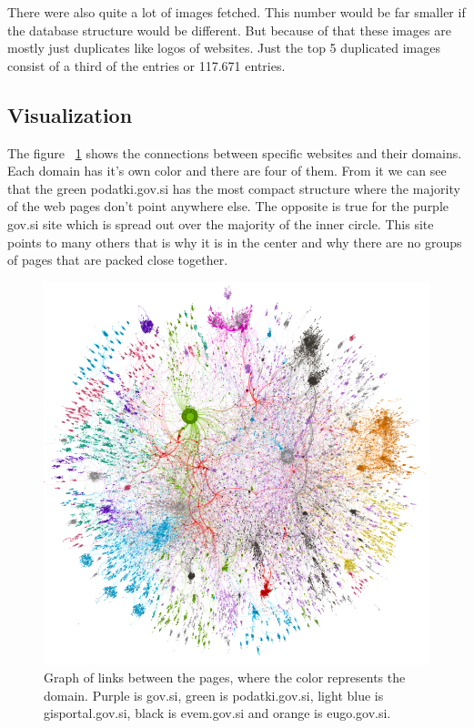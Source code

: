 \documentclass[9pt]{IEEEtran}
\begin{document}
There were also quite a lot of images fetched.
This number would be far smaller if the database structure would be different.
But because of that these images are mostly just duplicates like logos of websites.
Just the top 5 duplicated images consist of a third of the entries or 117.671 entries.

\subsection{Visualization}

The figure ~\ref{fig1} shows the connections between specific websites and their domains.
Each domain has it's own color and there are four of them.
From it we can see that the green podatki.gov.si has the most compact structure where the majority of the web pages don't point anywhere else.
The opposite is true for the purple gov.si site which is spread out over the majority of the inner circle.
This site points to many others that is why it is in the center and why there are no groups of pages that are packed close together.

\begin{figure}[ht]
    \centering
    \includegraphics[width=1\columnwidth]{data.png}
    \caption{Graph of links between the pages, where the color represents the domain. Purple is gov.si, green is podatki.gov.si, light blue is gisportal.gov.si, black is evem.gov.si and orange is eugo.gov.si.}
    \label{fig1}
\end{figure}
\end{document}
